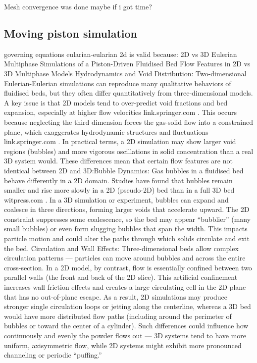 Mesh convergence was done maybe if i got time?

\subsection{Moving piston simulation}
governing equations eularian-eularian
2d is valid because:
2D vs 3D Eulerian Multiphase Simulations of a Piston-Driven Fluidised Bed
Flow Features in 2D vs 3D Multiphase Models
Hydrodynamics and Void Distribution: Two-dimensional Eulerian-Eulerian simulations can reproduce many qualitative behaviors of fluidised beds, but they often differ quantitatively from three-dimensional models. A key issue is that 2D models tend to over-predict void fractions and bed expansion, especially at higher flow velocities
link.springer.com
. This occurs because neglecting the third dimension forces the gas-solid flow into a constrained plane, which exaggerates hydrodynamic structures and fluctuations
link.springer.com
. In practical terms, a 2D simulation may show larger void regions (bubbles) and more vigorous oscillations in solid concentration than a real 3D system would. These differences mean that certain flow features are not identical between 2D and 3D:Bubble Dynamics: Gas bubbles in a fluidised bed behave differently in a 2D domain. Studies have found that bubbles remain smaller and rise more slowly in a 2D (pseudo-2D) bed than in a full 3D bed
witpress.com
. In a 3D simulation or experiment, bubbles can expand and coalesce in three directions, forming larger voids that accelerate upward. The 2D constraint suppresses some coalescence, so the bed may appear “bubblier” (many small bubbles) or even form slugging bubbles that span the width. This impacts particle motion and could alter the paths through which solids circulate and exit the bed.
Circulation and Wall Effects: Three-dimensional beds allow complex circulation patterns — particles can move around bubbles and across the entire cross-section. In a 2D model, by contrast, flow is essentially confined between two parallel walls (the front and back of the 2D slice). This artificial confinement increases wall friction effects and creates a large circulating cell in the 2D plane that has no out-of-plane escape. As a result, 2D simulations may produce stronger single circulation loops or jetting along the centerline, whereas a 3D bed would have more distributed flow paths (including around the perimeter of bubbles or toward the center of a cylinder). Such differences could influence how continuously and evenly the powder flows out — 3D systems tend to have more uniform, axisymmetric flow, while 2D systems might exhibit more pronounced channeling or periodic “puffing.”
